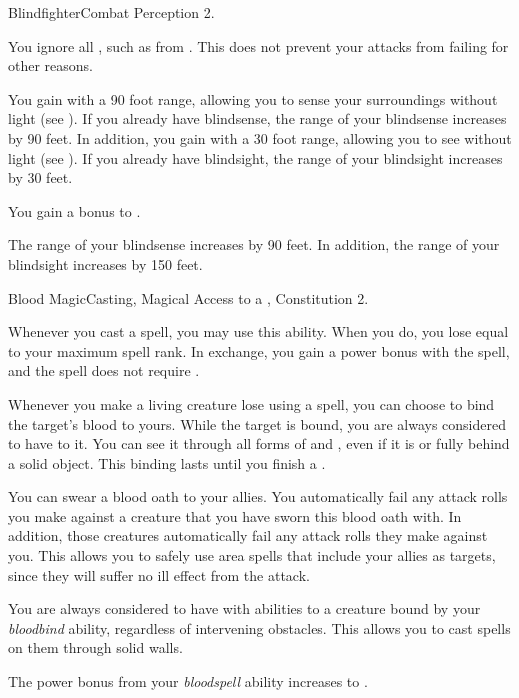     \begin{feat}{Blindfighter}{Combat}
        \featpre Perception 2.

         You ignore all , such as from .
        This does not prevent your attacks from failing for other reasons.

         You gain  with a 90 foot range, allowing you to sense your surroundings without light (see ).
        If you already have blindsense, the range of your blindsense increases by 90 feet.
        In addition, you gain  with a 30 foot range, allowing you to see without light (see ).
        If you already have blindsight, the range of your blindsight increases by 30 feet.

         You gain a  bonus to .

         The range of your blindsense increases by 90 feet.
        In addition, the range of your blindsight increases by 150 feet.
    \end{feat}

    \begin{magicalfeat}{Blood Magic}{Casting, Magical}
        \featpre Access to a , Constitution 2.

         Whenever you cast a spell, you may use this ability.
        When you do, you lose  equal to your maximum spell rank.
        In exchange, you gain a  power bonus with the spell, and the spell does not require .

         Whenever you make a living creature lose  using a spell, you can choose to bind the target's blood to yours.
        While the target is bound, you are always considered to have  to it.
        You can see it through all forms of  and , even if it is  or fully behind a solid object.
        This binding lasts until you finish a .

         You can swear a blood oath to your allies.
        You automatically fail any attack rolls you make against a creature that you have sworn this blood oath with.
        In addition, those creatures automatically fail any attack rolls they make against you.
        This allows you to safely use area spells that include your allies as targets, since they will suffer no ill effect from the attack.

         You are always considered to have  with \magical abilities to a creature bound by your \textit{bloodbind} ability, regardless of intervening obstacles.
        This allows you to cast spells on them through solid walls.

         The power bonus from your \textit{bloodspell} ability increases to .
    \end{magicalfeat}

